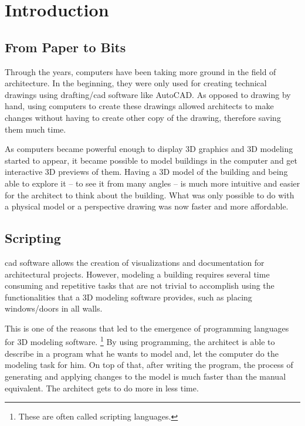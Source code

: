 
\chapter{Introduction}
\label{chapter:introduction}


\section{From Paper to Bits}

Through the years, computers have been taking more ground in the field of architecture.
In the beginning, they were only used for creating technical drawings using drafting/\gls{cad} software like AutoCAD.
As opposed to drawing by hand, using computers to create these drawings allowed architects to make changes without having to create other copy of the drawing, therefore saving them much time.

As computers became powerful enough to display 3D graphics and 3D modeling started to appear, it became possible to model buildings in the computer and get interactive 3D previews of them.
Having a 3D model of the building and being able to explore it -- to see it from many angles -- is much more intuitive and easier for the architect to think about the building.
What was only possible to do with a physical model or a perspective drawing was now faster and more affordable.


\section{Scripting}
\gls{cad} software allows the creation of visualizations and documentation for architectural projects.
However, modeling a building requires several time consuming and repetitive tasks that are not trivial to accomplish using the functionalities that a 3D modeling software provides, such as placing windows/doors in all walls.

This is one of the reasons that led to the emergence of programming languages for 3D modeling software.%
\footnote{These are often called scripting languages.}
By using programming, the architect is able to describe in a program what he wants to model and, let the computer do the modeling task for him.
On top of that, after writing the program, the process of generating and applying changes to the model is much faster than the manual equivalent.
The architect gets to do more in less time.

